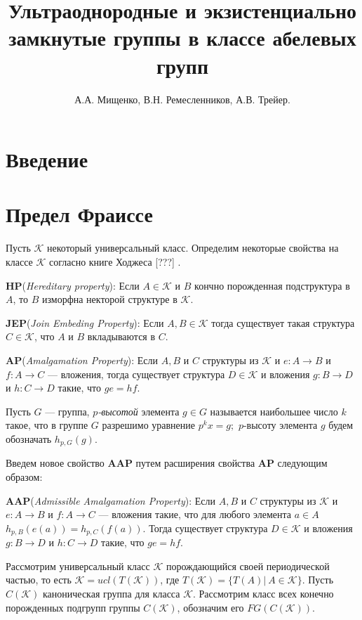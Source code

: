 \documentclass[14pt]{extarticle} %
\title{Ультраоднородные и экзистенциально замкнутые группы в классе абелевых групп}
\author{А.А. Мищенко, В.Н. Ремесленников, А.В. Трейер.}
\def\K{{\mathcal{K}}}
\def\HP{\textbf{HP}}
\def\JEP{\textbf{JEP}}
\def\AP{\textbf{AP}}
\def\AAP{\textbf{AAP}}
\begin{document}
\maketitle
\tableofcontents
\listoftodos



\section{Введение}

\section{Предел Фраиссе}

Пусть $\K$ некоторый универсальный класс. Определим некоторые свойства на классе $\K$ согласно книге Ходжеса [???] .

\noindent \HP  (\textit{Hereditary property}): Если $A \in \K$ и $B$ кончно порожденная подструктура в $A$, то $B$ изморфна некторой структуре в $\K$. 

\noindent \JEP  (\textit{Join Embeding Property}): Если $A, B \in \K$ тогда существует такая структура $C \in \K$, что $A$ и $B$ вкладываются в $C$.

\noindent \AP  (\textit{Amalgamation Property}): Если $A, B$ и $C$ структуры из $\K$ и $e : A \rightarrow B$ и $f : A \rightarrow C$ --- вложения, тогда существует структура $D \in \K$ и вложения $g : B \rightarrow D$ и $h : C \rightarrow D$ такие, что $ge = hf$. 

Пусть $G$ --- группа, \textit{$p$-высотой} элемента $g \in G$ называется наибольшее число $k$ такое, что в группе $G$ разрешимо уравнение $p^k x = g;$ $p$-высоту элемента $g$ будем обозначать $h_{p,G}(g).$ 

Введем новое свойство \AAP{} путем расширения свойства \AP{} следующим образом:

\noindent \AAP (\textit{Admissible Amalgamation Property}): Если $A, B$ и $C$ структуры из $\K$ и $e : A \rightarrow B$ и $f : A \rightarrow C$ --- вложения такие, что для любого элемента $a \in A$ $h_{p,B}(e(a)) = h_{p,C}(f(a))$. Тогда существует структура $D \in \K$ и вложения $g : B \rightarrow D$ и $h : C \rightarrow D$ такие, что $ge = hf$. 

Рассмотрим универсальный класс $\K$ порождающийся своей периодической частью, то есть $\K = ucl(T(\K))$, где $T(\K) = \{T(A) | \ A \in \K\}$. Пусть $C(\K)$ каноническая группа для класса $\K$. Рассмотрим класс всех конечно порожденных подгрупп группы $C(\K)$, обозначим его $FG(C(\K))$.
\end{document}
